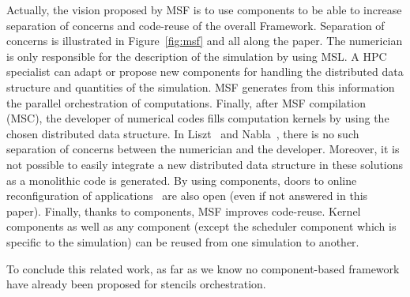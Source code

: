Actually, the vision proposed by MSF is to use components to be able to increase separation of concerns and code-reuse of the overall Framework.
Separation of concerns is illustrated in Figure~\ref{fig:msf} and all along the paper. The numerician is only responsible for the description of the simulation by using MSL. A HPC specialist can adapt or propose new components for handling the distributed data structure and quantities of the simulation. MSF generates from this information the parallel orchestration of computations. Finally, after MSF compilation (MSC), the developer of numerical codes fills computation kernels by using the chosen distributed data structure. In Liszt~\cite{DeVito:2011:LDS:2063384.2063396} and Nabla~\cite{Camier:2015:IPP:2820083.2820107}, there is no such separation of concerns between the numerician and the developer. 
Moreover, it is not possible to easily integrate a new distributed data structure in these solutions as a monolithic code is generated. By using components, doors to online reconfiguration of applications~\cite{Lanore:2015:RCM:2737166.2737169} are also open (even if not answered in this paper).
Finally, thanks to components, MSF improves code-reuse. Kernel components as well as any component (except the scheduler component which is specific to the simulation) can be reused from one simulation to another.

To conclude this related work, as far as we know no component-based framework have already been proposed for stencils orchestration.
